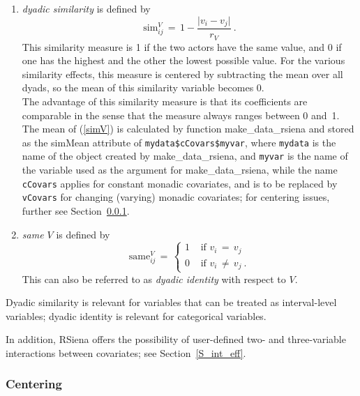 \documentclass[a4paper,fleqn,11pt]{article}
\newcommand{\+}{\, + \,}
\newcommand{\sfn}[1]{\textsf{#1}}
\newcommand{\RS}{{\sf \textsf{RSiena} }}
\begin{document}
\begin{enumerate}
\item \emph{dyadic similarity} is defined by
\begin{equation}
 \text{sim}^V_{ij} \,=\, 1 - \frac{ \vert v_i - v_j \vert }{ r_V } \ .
            \label{simV}
\end{equation}
      This similarity measure is 1 if
      the two actors have the same value, and 0 if one has the highest and the
      other the lowest possible value.
      For the various similarity effects, this measure
      is centered by subtracting the mean over all dyads,
      so the mean of this similarity variable becomes 0.    \\
      The advantage of this similarity measure is that its coefficients
      are comparable in the sense that the measure always ranges
      between 0 and~1.  \\
      The mean of (\ref{simV}) is calculated by function
      \textsf{make\_data\_rsiena} and stored as the \sfn{simMean} attribute
      of \texttt{mydata\$cCovars\$myvar}, where \texttt{mydata} is the name
      of the object created by \textsf{make\_data\_rsiena}, and \texttt{myvar}
      is the name of the variable used as the argument for
      \textsf{make\_data\_rsiena}, while the name \texttt{cCovars} applies for
      constant monadic covariates, and is to be replaced by \texttt{vCovars}
      for changing (varying) monadic covariates;
      for centering issues, further see Section~\ref{S_center}.
\item \emph{same $V$} is defined by
\begin{equation}
 \text{same}^V_{ij} \,=\,
        \left\{ \begin{array}{ll} 1 & \text{ if } v_i \,=\, v_j \\
                          0 & \text{ if } v_i \,\neq\, v_j \ .
    \end{array} \right.
\end{equation}
      This can also be referred to as \emph{dyadic identity}
      with respect to $V$.
\end{enumerate}
Dyadic similarity is relevant for variables that can be treated as
interval-level variables; dyadic identity is relevant for categorical variables.

In addition, \RS offers the possibility of user-defined two- and three-variable
interactions between covariates; see Section~\ref{S_int_eff}.


\subsubsection{Centering}
\label{S_center}
\end{document}

